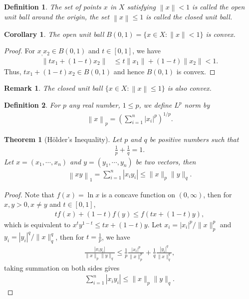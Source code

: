 \documentclass[10pt]{book}
\newtheorem{definition}{Definition}[chapter]
\newtheorem{theorem}{Theorem}[chapter]
\newtheorem{corollary}{Corollary}[theorem]
\newtheorem{remark}{Remark}[chapter]
\theoremstyle{definition}
\numberwithin{equation}{chapter}
\begin{document}
\medskip

\begin{definition}
The set of points $x$ in $X$ satisfying $\left\|x\right\| < 1$ is called the open unit ball around the origin, the set $\left\|x\right\| \leq 1$ is called the closed unit ball.
\end{definition}

\medskip

\begin{corollary}
The open unit ball $B(0,1) = \{x \in X: \|x\| < 1\}$ is convex.
\end{corollary}
\begin{proof}
For $x_, x_2 \in B(0,1)$ and $t \in [0,1]$, we have
\begin{align*}
    \|tx_1 + (1-t)x_2\| & \leq t\|x_1\| + (1-t)\|x_2\| < 1.
\end{align*}
Thus, $tx_1 + (1-t)x_2 \in B(0,1)$ and hence $B(0,1)$ is convex.
\end{proof}

\begin{remark}
The closed unit ball $\{x \in X: \left\|x\right\| \leq 1\}$ is also convex.
\end{remark}

\medskip

\begin{definition}
For $p$ any real number, $1 \leq p$, we define $L^p$ norm by 
\begin{align*}
    \left\|x\right\|_p = \left(\sum^n_{i=1} |x_i|^p \right)^{1/p}.
\end{align*}
\end{definition}

\medskip

\begin{theorem}[Hölder's Inequality]
Let $p$ and $q$ be positive numbers such that 
\begin{align*}
    \frac{1}{p} + \frac{1}{q} = 1.
\end{align*}
Let $x = (x_1, \cdots, x_n)$ and $y = (y_1, \cdots, y_n)$ be two vectors, then 
\begin{align*}
    \left\|xy\right\|_1 = \sum^n_{i=1} \left|x_i y_i\right| \leq \|x\|_p \|y\|_q.
\end{align*}
\end{theorem}
\begin{proof}
Note that $f(x) = \ln x$ is a concave function on $(0, \infty)$, then for $x, y > 0, x \neq y$ and $t \in [0,1]$, 
\begin{align*}
    t f(x) + (1-t) f(y) \leq f(tx + (1-t)y),
\end{align*}
which is equivalent to $x^t y^{1-t} \leq tx + (1-t)y$. Let $x_i =|x_i|^p/\|x\|^p_p$ and $y_i = |y_i|^q/\|x\|^q_q$, then for $t = \frac{1}{p}$, we have
\begin{align*}
    \frac{|x_i y_i|}{\|x\|_p \|y\|_q} \leq \frac{1}{p} \frac{|x_i|^p}{\|x\|^p_p} + \frac{1}{q} \frac{|y_i|^q}{\|x\|^q_q},
\end{align*}
taking summation on both sides gives
\begin{align*}
    \sum^n_{i=1} \left|x_i y_i\right| \leq \|x\|_p \|y\|_q.
\end{align*}
\end{proof}
\end{document}
